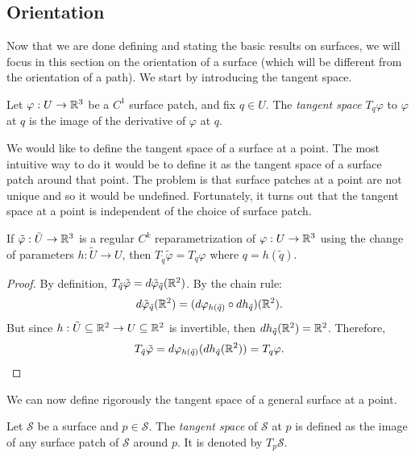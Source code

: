 \subsection{Orientation}

Now that we are done defining and stating the basic results on surfaces, we will focus in this section on the orientation of a surface (which will be different from the orientation of a path). We start by introducing the tangent space.

\begin{definition}
    Let $\varphi: U \to \mathbb{R}^3$ be a $C^1$ surface patch, and fix $q \in U$. The \textit{tangent space} $T_q\varphi$ to $\varphi$ at $q$ is the image of the derivative of $\varphi$ at $q$.
\end{definition}

We would like to define the tangent space of a surface at a point. The most intuitive way to do it would be to define it as the tangent space of a surface patch around that point. The problem is that surface patches at a point are not unique and so it would be undefined. Fortunately, it turns out that the tangent space at a point is independent of the choice of surface patch.

\begin{proposition}
    If $\tilde{\varphi} : \tilde{U} \to \mathbb{R}^3$ is a regular $C^k$ reparametrization of $\varphi : U \to \mathbb{R}^3$ using the change of parameters $h : \tilde{U} \to U$, then $T_{\tilde{q}}\tilde{\varphi} = T_q \varphi$ where $q = h(\tilde{q})$.
\end{proposition}

\begin{proof}
    By definition, $T_{\tilde{q}}\tilde{\varphi} = d \tilde{\varphi}_{\tilde{q}}(\mathbb{R}^2)$. By the chain rule:
    $$d \tilde{\varphi}_{\tilde{q}}(\mathbb{R}^2) = (d \varphi_{h(\tilde{q})} \circ d h_{\tilde{q}})(\mathbb{R}^2).$$
    But since $h: \tilde{U} \subseteq \mathbb{R}^2 \to U \subseteq \mathbb{R}^2$ is invertible, then $dh_{\tilde{q}}(\mathbb{R}^2) = \mathbb{R}^2$. Therefore, 
    $$T_{\tilde{q}}\tilde{\varphi} = d \varphi_{h(\tilde{q})}(d h_{\tilde{q}}(\mathbb{R}^2)) = T_q \varphi.$$
\end{proof}

We can now define rigorously the tangent space of a general surface at a point.

\begin{definition}
    Let $\mathcal{S}$ be a surface and $p \in \mathcal{S}$. The \textit{tangent space} of $\mathcal{S}$ at $p$ is defined as the image of any surface patch of $\mathcal{S}$ around $p$. It is denoted by $T_p \mathcal{S}$.
\end{definition}

